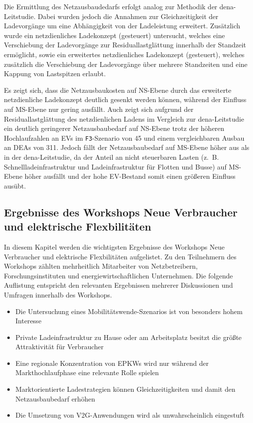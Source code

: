 Die Ermittlung des Netzausbaudedarfs erfolgt analog zur Methodik der dena-Leitstudie.
Dabei wurden jedoch die Annahmen zur Gleichzeitigkeit der Ladevorgänge um eine Abhängigkeit von der Ladeleistung erweitert.
Zusätzlich wurde ein netzdienliches Ladekonzept (gesteuert) untersucht, welches eine Verschiebung der Ladevorgänge zur Residuallastglättung innerhalb der Standzeit ermöglicht, sowie ein erweitertes netzdienliches Ladekonzept (gesteuert\Plus), welches zusätzlich die Verschiebung der Ladevorgänge über mehrere Standzeiten und eine Kappung von Lastspitzen erlaubt.\medskip

Es zeigt sich, dass die Netzausbaukosten auf \gls{NS}-Ebene durch das erweiterte netzdienliche Ladekonzept deutlich gesenkt werden können, während der Einfluss auf \gls{MS}-Ebene nur gering ausfällt.
Auch zeigt sich aufgrund der Residuallastglättung des netzdienlichen Ladens im Vergleich zur dena-Leitstudie ein deutlich geringerer Netzausbaubedarf auf \gls{NS}-Ebene trotz der höheren Hochlaufzahlen an \glspl{EV} im \texttt{F3}-Szenario von \SI{45}{\MioStk} und einem vergleichbaren Ausbau an \glspl{DEA} von \SI{311}{\gw}.
Jedoch fällt der Netzausbaubedarf auf \gls{MS}-Ebene höher aus als in der dena-Leitstudie, da der Anteil an nicht steuerbaren Lasten (z.~B. Schnellladeinfrastruktur und Ladeinfrastruktur für Flotten und Busse) auf \gls{MS}-Ebene höher ausfällt und der hohe \gls{EV}-Bestand somit einen größeren Einfluss ausübt.

\subsection{Ergebnisse des Workshops \glqq Neue Verbraucher und elektrische Flexbilitäten\grqq{}}

In diesem Kapitel werden die wichtigsten Ergebnisse des Workshops \glqq Neue Verbraucher und elektrische Flexbilitäten\grqq{} aufgelistet.
Zu den Teilnehmern des Workshops zählten mehrheitlich Mitarbeiter von Netzbetreibern, Forschungsinstituten und energiewirtschaftlichen Unternehmen.
Die folgende Auflistung entspricht den relevanten Ergebnissen mehrerer Diskussionen und Umfragen innerhalb des Workshops.

\begin{itemize}
	\item Die Untersuchung eines Mobilitätswende-Szenarios ist von besonders hohem Interesse
	\item Private Ladeinfrastruktur zu Hause oder am Arbeitsplatz besitzt die größte Attraktivität für Verbraucher
	\item Eine regionale Konzentration von \glspl{EPKW} wird nur während der Markthochlaufphase eine relevante Rolle spielen
	\item Marktorientierte Ladestrategien können Gleichzeitigkeiten und damit den Netzausbaubedarf erhöhen
	\item Die Umsetzung von \gls{V2G}-Anwendungen wird als unwahrscheinlich eingestuft
	
\end{itemize}

